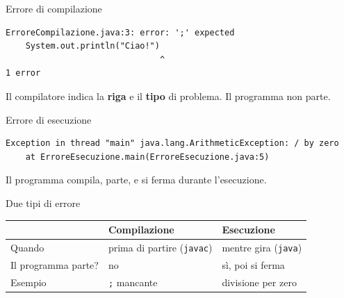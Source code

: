 \documentclass[aspectratio=169,10pt,t]{beamer}
\begin{document}
\begin{frame}[fragile]{Errore di compilazione}
\begin{lstlisting}[language={},numbers=none]
ErroreCompilazione.java:3: error: ';' expected
    System.out.println("Ciao!")
                               ^
1 error
\end{lstlisting}
  Il compilatore indica la \textbf{riga} e il \textbf{tipo} di problema. Il programma non parte.
\end{frame}

\begin{frame}[fragile]{Errore di esecuzione}
\begin{lstlisting}[language={},numbers=none]
Exception in thread "main" java.lang.ArithmeticException: / by zero
	at ErroreEsecuzione.main(ErroreEsecuzione.java:5)
\end{lstlisting}
  Il programma compila, parte, e si ferma durante l'esecuzione.
\end{frame}

\begin{frame}{Due tipi di errore}
  \begin{center}
  \begin{tabular}{|l|l|l|}
    \hline
     & \textbf{Compilazione} & \textbf{Esecuzione} \\ \hline
    Quando & prima di partire (\texttt{javac}) & mentre gira (\texttt{java}) \\ \hline
    Il programma parte? & no & s\`i, poi si ferma \\ \hline
    Esempio & \texttt{;} mancante & divisione per zero \\ \hline
  \end{tabular}
  \end{center}
\end{frame}
\end{document}
